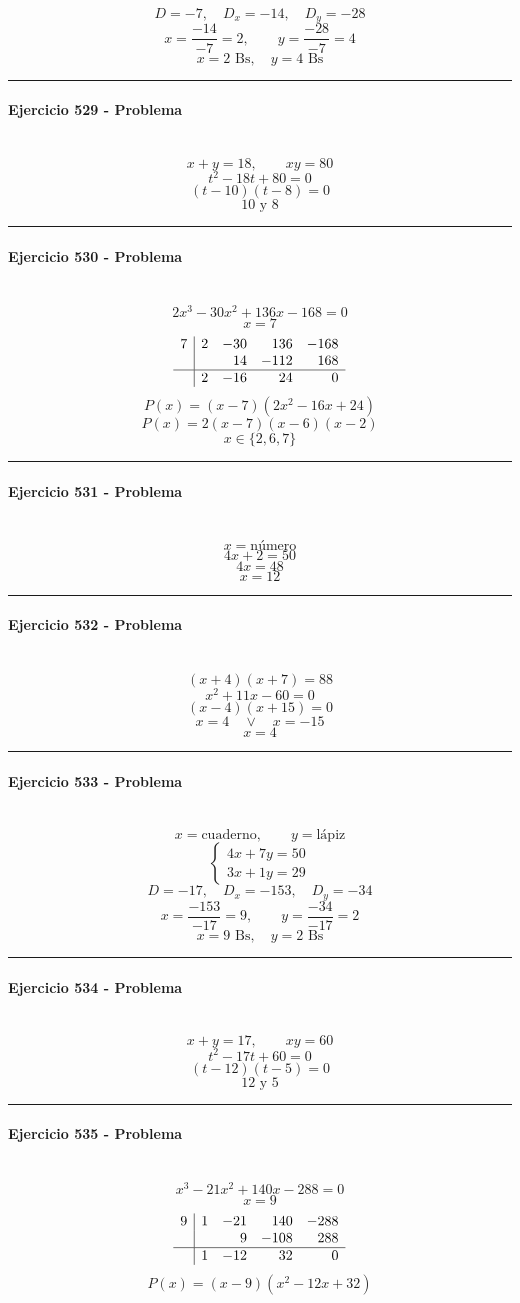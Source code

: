 \documentclass[10pt,a4paper]{article}
\newcommand{\res}[1]{\paragraph{#1}\mbox{}\\[-1.2em]}
\begin{document}
\[ D=-7,\quad D_x=-14,\quad D_y=-28 \]
\[ x=\frac{-14}{-7}=2,\qquad y=\frac{-28}{-7}=4 \]
\[ \boxed{x=2\text{ Bs},\quad y=4\text{ Bs}} \]
\vspace{1mm}\hrule\vspace{2mm}
\res{Ejercicio 529 - Problema}
\[ x+y=18,\qquad xy=80 \]
\[ t^2-18t+80=0 \]
\[ (t-10)(t-8)=0 \]
\[ \boxed{10\text{ y }8} \]
\vspace{1mm}\hrule\vspace{2mm}
\res{Ejercicio 530 - Problema}
\[ 2 x^{3} - 30 x^{2} + 136 x - 168=0 \]
\[ x=7 \]
\[\begin{array}{r|rrrr}7 & 2 & -30 & 136 & -168\\  &  & 14 & -112 & 168\\\hline  & 2 & -16 & 24 & 0\end{array}\]
\[ P(x)=(x-7)(2 x^{2} - 16 x + 24) \]
\[ P(x)=2(x-7)(x-6)(x-2) \]
\[ \boxed{x\in\{2,6,7\}} \]
\vspace{1mm}\hrule\vspace{2mm}
\res{Ejercicio 531 - Problema}
\[ x=\text{número} \]
\[ 4x+2=50 \]
\[ 4x=48 \]
\[ \boxed{x=12} \]
\vspace{1mm}\hrule\vspace{2mm}
\res{Ejercicio 532 - Problema}
\[ (x+4)(x+7)=88 \]
\[ x^{2} + 11 x - 60=0 \]
\[ (x-4)(x+15)=0 \]
\[ x=4\quad \vee \quad x=-15 \]
\[ \boxed{x=4} \]
\vspace{1mm}\hrule\vspace{2mm}
\res{Ejercicio 533 - Problema}
\[ x=\text{cuaderno},\qquad y=\text{lápiz} \]
\[ \begin{cases}4x+7y=50\\3x+1y=29\end{cases} \]
\[ D=-17,\quad D_x=-153,\quad D_y=-34 \]
\[ x=\frac{-153}{-17}=9,\qquad y=\frac{-34}{-17}=2 \]
\[ \boxed{x=9\text{ Bs},\quad y=2\text{ Bs}} \]
\vspace{1mm}\hrule\vspace{2mm}
\res{Ejercicio 534 - Problema}
\[ x+y=17,\qquad xy=60 \]
\[ t^2-17t+60=0 \]
\[ (t-12)(t-5)=0 \]
\[ \boxed{12\text{ y }5} \]
\vspace{1mm}\hrule\vspace{2mm}
\res{Ejercicio 535 - Problema}
\[ x^{3} - 21 x^{2} + 140 x - 288=0 \]
\[ x=9 \]
\[\begin{array}{r|rrrr}9 & 1 & -21 & 140 & -288\\  &  & 9 & -108 & 288\\\hline  & 1 & -12 & 32 & 0\end{array}\]
\[ P(x)=(x-9)(x^{2} - 12 x + 32) \]
\end{document}
